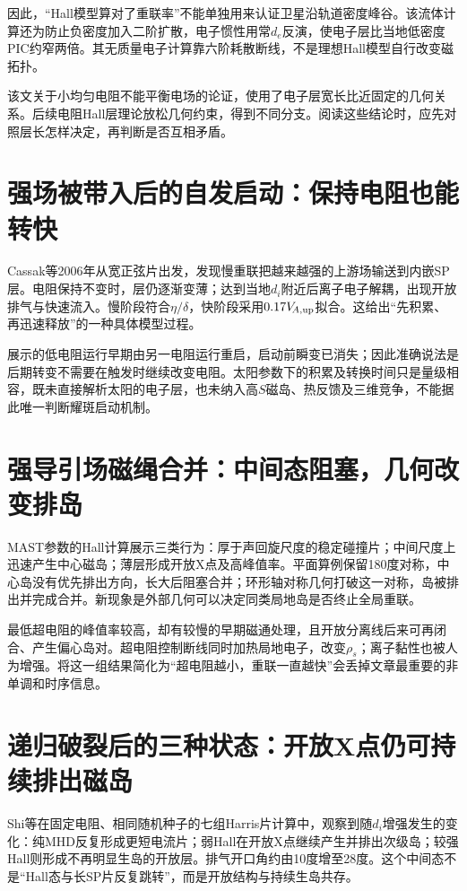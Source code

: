 因此，“Hall模型算对了重联率”不能单独用来认证卫星沿轨道密度峰谷。该流体计算还为防止负密度加入二阶扩散，电子惯性用常$d_e$反演，使电子层比当地低密度PIC约窄两倍。其无质量电子计算靠六阶耗散断线，不是理想Hall模型自行改变磁拓扑。

该文关于小均匀电阻不能平衡电场的论证，使用了电子层宽长比近固定的几何关系。后续电阻Hall层理论放松几何约束，得到不同分支。阅读这些结论时，应先对照层长怎样决定，再判断是否互相矛盾。\citep{Shay2001,Malyshkin2008,Simakov2009}

\section{强场被带入后的自发启动：保持电阻也能转快}
Cassak等2006年从宽正弦片出发，发现慢重联把越来越强的上游场输送到内嵌SP层。电阻保持不变时，层仍逐渐变薄；达到当地$d_i$附近后离子电子解耦，出现开放排气与快速流入。慢阶段符合$\eta/\delta$，快阶段采用$0.17V_{\!A,\rm up}$拟合。这给出“先积累、再迅速释放”的一种具体模型过程。\citep{Cassak2006}

展示的低电阻运行早期由另一电阻运行重启，启动前瞬变已消失；因此准确说法是后期转变不需要在触发时继续改变电阻。太阳参数下的积累及转换时间只是量级相容，既未直接解析太阳的电子层，也未纳入高$S$磁岛、热反馈及三维竞争，不能据此唯一判断耀斑启动机制。

\section{强导引场磁绳合并：中间态阻塞，几何改变排岛}
MAST参数的Hall计算展示三类行为：厚于声回旋尺度的稳定碰撞片；中间尺度上迅速产生中心磁岛；薄层形成开放X点及高峰值率。平面算例保留180度对称，中心岛没有优先排出方向，长大后阻塞合并；环形轴对称几何打破这一对称，岛被排出并完成合并。新现象是外部几何可以决定同类局地岛是否终止全局重联。\citep{Stanier2013}

最低超电阻的峰值率较高，却有较慢的早期磁通处理，且开放分离线后来可再闭合、产生偏心岛对。超电阻控制断线同时加热局地电子，改变$\rho_s$；离子黏性也被人为增强。将这一组结果简化为“超电阻越小，重联一直越快”会丢掉文章最重要的非单调和时序信息。

\section{递归破裂后的三种状态：开放X点仍可持续排出磁岛}
Shi等在固定电阻、相同随机种子的七组Harris片计算中，观察到随$d_i$增强发生的变化：纯MHD反复形成更短电流片；弱Hall在开放X点继续产生并排出次级岛；较强Hall则形成不再明显生岛的开放层。排气开口角约由10度增至28度。这个中间态不是“Hall态与长SP片反复跳转”，而是开放结构与持续生岛共存。\citep{L263}

